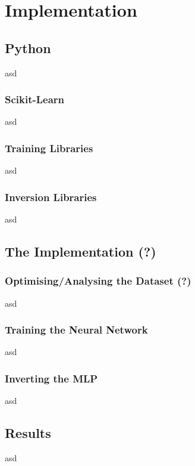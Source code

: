 \chapter{Implementation}



\section{Python}

asd


\subsection{Scikit-Learn}

asd


\subsection{Training Libraries}

asd


\subsection{Inversion Libraries}

asd




\section{The Implementation (?)}



\subsection{Optimising/Analysing the Dataset (?)}

asd


\subsection{Training the Neural Network}

asd


\subsection{Inverting the MLP}

asd




\section{Results}

asd